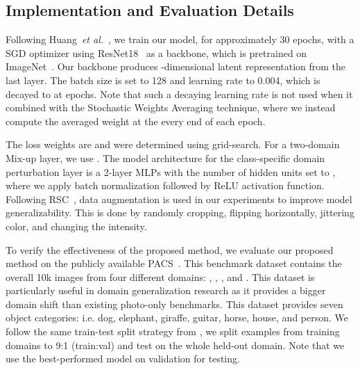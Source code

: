 \documentclass[10pt,twocolumn,letterpaper]{article}
\renewcommand{\etal}{\textit{et al.}}
\newcommand{\myparagraph}[1]{\vspace{4pt}\noindent{\bf #1}}
\begin{document}
\subsection{Implementation and Evaluation Details}
Following Huang~\etal~\cite{huangRSC2020}, we train our model, for approximately 30 epochs, with a SGD optimizer using ResNet18~\cite{he2016deep} as a backbone, which is pretrained on ImageNet~\cite{deng2009imagenet}. Our backbone produces -dimensional latent representation from the last layer. The batch size is set to 128 and learning rate to 0.004, which is decayed to  at  epochs. Note that such a decaying learning rate is not used when it combined with the Stochastic Weights Averaging technique, where we instead compute the averaged weight  at the every end of each epoch. 

The loss weights are  and  were determined using grid-search. For a two-domain Mix-up layer, we use . The model architecture for the class-specific domain perturbation layer  is a 2-layer MLPs with the number of hidden units set to , where we apply batch normalization followed by ReLU activation function. Following RSC~\cite{huangRSC2020}, data augmentation is used in our experiments to improve model generalizability. This is done by randomly cropping, flipping horizontally, jittering color, and changing the intensity.

\myparagraph{Dataset}
To verify the effectiveness of the proposed method, we evaluate our proposed method on the publicly available PACS~\cite{Li2017dg}. This benchmark dataset contains the overall 10k images from four different domains: , , , and . This dataset is particularly useful in domain generalization research as it provides a bigger domain shift than existing photo-only benchmarks. This dataset provides seven object categories: i.e. dog, elephant, giraffe, guitar, horse, house, and person. We follow the same train-test split strategy from \cite{Li2017dg}, we split examples from training domains to 9:1 (train:val) and test on the whole held-out domain. Note that we use the best-performed model on validation for testing.
\end{document}
